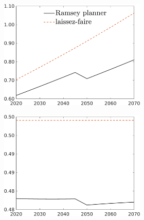 \begin{figure}[h!!]
	\centering
	\caption{Allocations in levels }\label{fig:LF}	
	\begin{subfigure}{1\textwidth}		
		\caption{Laissez-faire and optimal allocation}
	\begin{subfigure}[]{0.32\textwidth}
		\includegraphics[width=1\textwidth]{../../codding_model/own_basedOnFried/optimalPol_010922_revision/figures/all_13Sept22_Tplus30/C_LFCompOPT_T_NoTaus_regime4_spillover0_noskill0_sep0_xgrowth0_PV1_etaa0.79_lgd1.png}
	\end{subfigure}	
	\begin{subfigure}[]{0.32\textwidth}
	\includegraphics[width=1\textwidth]{../../codding_model/own_basedOnFried/optimalPol_010922_revision/figures/all_13Sept22_Tplus30/hh_LFCompOPT_T_NoTaus_regime4_spillover0_noskill0_sep0_xgrowth0_PV1_etaa0.79_lgd0.png}

\end{subfigure}
\end{subfigure}
\end{figure}
